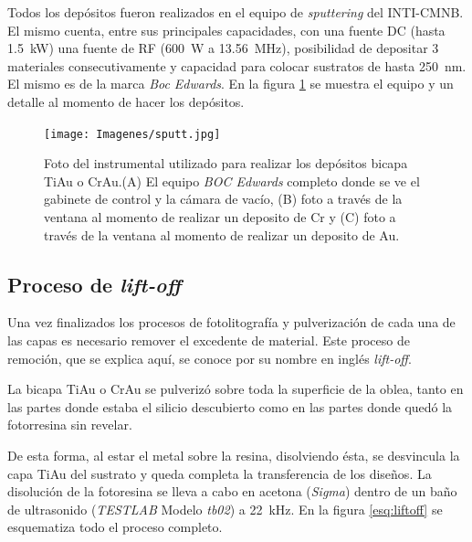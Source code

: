 		   	Todos los depósitos fueron realizados en el equipo de \textit{sputtering} del INTI-CMNB. El mismo cuenta, entre sus principales capacidades, con una fuente DC (hasta \SI{1.5}{\kW}) una fuente de RF (\SI{600}{W} a \SI{13.56}{\MHz}), posibilidad de depositar 3 materiales consecutivamente y capacidad para colocar sustratos de hasta \SI{250}{\nm}. El mismo es de la marca \textit{Boc Edwards}. En la figura \ref{fig:sputt} se muestra el equipo y un detalle al momento de hacer los depósitos.


		   		  \begin{figure}[h!]
				  \begin{center}
				  \texttt{[image: Imagenes/sputt.jpg]}
				  \caption[Equipo para depósito de películas delgadas, \textit{sputtering}]{Foto del instrumental utilizado para realizar los depósitos bicapa Ti\textbar Au o Cr\textbar Au.(A) El equipo \textit{BOC Edwards} completo donde se ve el gabinete de control y la cámara de vacío, (B) foto a través de la ventana al momento de realizar un deposito de Cr y (C) foto a través de la ventana al momento de realizar un deposito de Au.}
				  \label{fig:sputt}
				  \end{center}
				  \end{figure}

	\vspace*{-1.0cm}\subsection{Proceso de\textit{ lift-off}}\label{sec:liffff}

   	     Una vez finalizados los procesos de fotolitografía y pulverización de cada una de las capas es necesario remover el excedente de material. Este proceso de remoción, que se explica aquí, se conoce por su nombre en inglés \textit{lift-off}.

		 La bicapa Ti\textbar Au o Cr\textbar Au se pulverizó sobre toda la superficie de la oblea, tanto en las partes donde estaba el silicio descubierto como en las partes donde quedó la fotorresina sin revelar. 
		
		 De esta forma, al estar el metal sobre la resina, disolviendo ésta, se desvincula la capa Ti\textbar Au del sustrato y queda completa la transferencia de los diseños. 
		 La disolución de la fotoresina se lleva a cabo en acetona (\textit{Sigma}) dentro de un baño de ultrasonido (\textit{TESTLAB} Modelo \textit{tb02}) a \SI{22}{\kHz}. En la figura \ref{esq:liftoff} se esquematiza todo el proceso completo.

